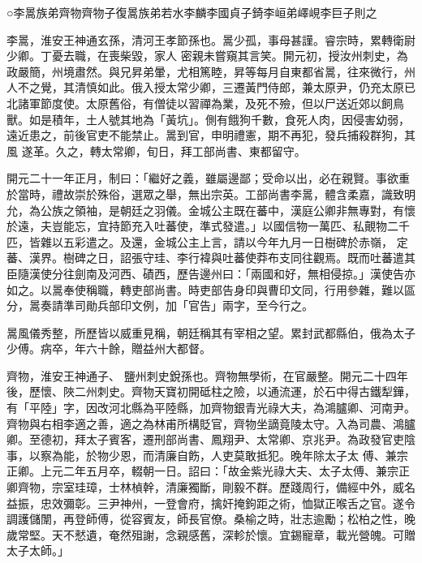 
\begin{pinyinscope}

 ○李暠族弟齊物齊物子復暠族弟若水李麟李國貞子錡李峘弟嶧峴李巨子則之



 李暠，淮安王神通玄孫，清河王孝節孫也。暠少孤，事母甚謹。睿宗時，累轉衛尉少卿。丁憂去職，在喪柴毀，家人
 密親未嘗窺其言笑。開元初，授汝州刺史，為政嚴簡，州境肅然。與兄昇弟暈，尤相篤睦，昇等每月自東都省暠，往來微行，州人不之覺，其清慎如此。俄入授太常少卿，三遷黃門侍郎，兼太原尹，仍充太原已北諸軍節度使。太原舊俗，有僧徒以習禪為業，及死不殮，但以尸送近郊以飼鳥獸。如是積年，土人號其地為「黃坑」。側有餓狗千數，食死人肉，因侵害幼弱，遠近患之，前後官吏不能禁止。暠到官，申明禮憲，期不再犯，發兵捕殺群狗，其風
 遂革。久之，轉太常卿，旬日，拜工部尚書、東都留守。



 開元二十一年正月，制曰：「繼好之義，雖屬邊鄙；受命以出，必在親賢。事欲重於當時，禮故崇於殊俗，選眾之舉，無出宗英。工部尚書李暠，體含柔嘉，識致明允，為公族之領袖，是朝廷之羽儀。金城公主既在蕃中，漢庭公卿非無專對，有懷於遠，夫豈能忘，宜持節充入吐蕃使，準式發遣。」以國信物一萬匹、私覿物二千匹，皆雜以五彩遣之。及還，金城公主上言，請以今年九月一日樹碑於赤嶺，
 定蕃、漢界。樹碑之日，詔張守珪、李行褘與吐蕃使莽布支同往觀焉。既而吐蕃遣其臣隨漢使分往劍南及河西、磧西，歷告邊州曰：「兩國和好，無相侵掠。」漢使告亦如之。以暠奉使稱職，轉吏部尚書。時吏部告身印與曹印文同，行用參雜，難以區分，暠奏請準司勛兵部印文例，加「官告」兩字，至今行之。



 暠風儀秀整，所歷皆以威重見稱，朝廷稱其有宰相之望。累封武都縣伯，俄為太子少傅。病卒，年六十餘，贈益州大都督。



 齊物，淮安王神通子、
 鹽州刺史銳孫也。齊物無學術，在官嚴整。開元二十四年後，歷懷、陜二州刺史。齊物天寶初開砥柱之險，以通流運，於石中得古鐵犁鏵，有「平陸」字，因改河北縣為平陸縣，加齊物銀青光祿大夫，為鴻臚卿、河南尹。齊物與右相李適之善，適之為林甫所構貶官，齊物坐謫竟陵太守。入為司農、鴻臚卿。至德初，拜太子賓客，遷刑部尚書、鳳翔尹、太常卿、京兆尹。為政發官吏陰事，以察為能，於物少恩，而清廉自飭，人吏莫敢抵犯。晚年除太子太
 傅、兼宗正卿。上元二年五月卒，輟朝一日。詔曰：「故金紫光祿大夫、太子太傅、兼宗正卿齊物，宗室珪璋，士林楨幹，清廉獨斷，剛毅不群。歷踐周行，備經中外，威名益振，忠效彌彰。三尹神州，一登會府，擒奸掩鉤距之術，恤獄正喉舌之官。遂令調護儲闈，再登師傅，從容賓友，師長官僚。桑榆之時，壯志逾勵；松柏之性，晚歲常堅。天不憖遺，奄然殂謝，念親感舊，深軫於懷。宜錫寵章，載光營魄。可贈太子太師。」




\end{pinyinscope}
